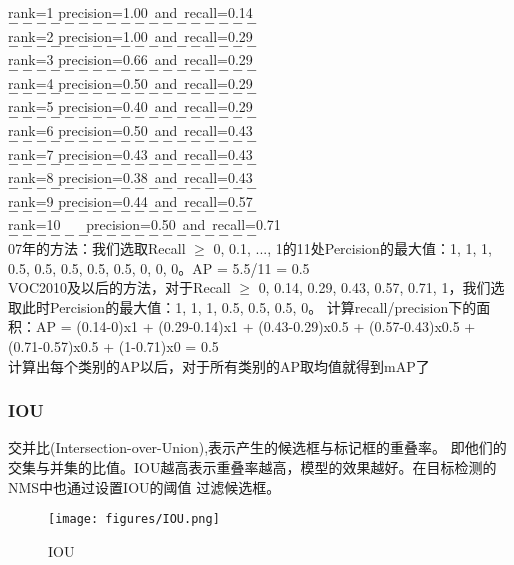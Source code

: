 \documentclass{article}
\begin{document}
\begin{CJK}{UTF8}{gbsn}
rank=1 \quad  precision=1.00\  and\  recall=0.14\\
$------------------$\\
rank=2 \quad precision=1.00\  and\  recall=0.29\\
$------------------$\\
rank=3 \quad precision=0.66\  and\  recall=0.29\\
$------------------$\\
rank=4 \quad precision=0.50\  and\  recall=0.29\\
$------------------$\\
rank=5 \quad precision=0.40\  and\  recall=0.29\\
$------------------$\\
rank=6 \quad precision=0.50\  and\  recall=0.43\\
$------------------$\\
rank=7 \quad precision=0.43\  and\  recall=0.43\\
$------------------$\\
rank=8 \quad precision=0.38\  and\  recall=0.43\\
$------------------$\\
rank=9 \quad precision=0.44\  and\  recall=0.57\\
$------------------$\\
rank=10 \ \ \  precision=0.50\  and\  recall=0.71\\
$------------------$\\
07年的方法：我们选取Recall $\ge${ 0, 0.1, ..., 1}的11处Percision的最大值：1, 1, 1, 0.5, 0.5, 0.5, 0.5, 0.5, 0, 0, 0。AP = 5.5/11 = 0.5\\
VOC2010及以后的方法，对于Recall $\ge$ {0, 0.14, 0.29, 0.43, 0.57, 0.71, 1}，我们选取此时Percision的最大值：1, 1, 1, 0.5, 0.5, 0.5, 0。
计算recall/precision下的面积：AP = (0.14-0)x1 + (0.29-0.14)x1 + (0.43-0.29)x0.5 + (0.57-0.43)x0.5 + (0.71-0.57)x0.5 + (1-0.71)x0 = 0.5\\
计算出每个类别的AP以后，对于所有类别的AP取均值就得到mAP了
\subsubsection{IOU}
交并比(Intersection-over-Union),表示产生的候选框与标记框的重叠率。
即他们的交集与并集的比值。IOU越高表示重叠率越高，模型的效果越好。在目标检测的NMS中也通过设置IOU的阈值
过滤候选框。
\begin{figure}[!h]
    \centering
    \texttt{[image: figures/IOU.png]}
    \caption{IOU}
    \label{IOU}
\end{figure}

\end{CJK}
\end{document}
